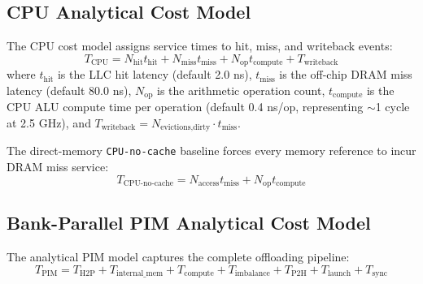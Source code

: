 \documentclass[journal,10pt,twocolumn]{IEEEtran}
\begin{document}
\subsection{CPU Analytical Cost Model}
The CPU cost model assigns service times to hit, miss, and writeback events:
\begin{equation}
T_{\text{CPU}} = N_{\text{hit}} t_{\text{hit}} + N_{\text{miss}} t_{\text{miss}} + N_{\text{op}} t_{\text{compute}} + T_{\text{writeback}}
\end{equation}
where $t_{\text{hit}}$ is the LLC hit latency (default 2.0 ns), $t_{\text{miss}}$ is the off-chip DRAM miss latency (default 80.0 ns), $N_{\text{op}}$ is the arithmetic operation count, $t_{\text{compute}}$ is the CPU ALU compute time per operation (default 0.4 ns/op, representing $\sim$1 cycle at 2.5 GHz), and $T_{\text{writeback}} = N_{\text{evictions,dirty}} \cdot t_{\text{miss}}$.

The direct-memory \texttt{CPU-no-cache} baseline forces every memory reference to incur DRAM miss service:
\begin{equation}
T_{\text{CPU-no-cache}} = N_{\text{access}} t_{\text{miss}} + N_{\text{op}} t_{\text{compute}}
\end{equation}

\subsection{Bank-Parallel PIM Analytical Cost Model}
The analytical PIM model captures the complete offloading pipeline:
\begin{equation}
T_{\text{PIM}} = T_{\text{H2P}} + T_{\text{internal\_mem}} + T_{\text{compute}} + T_{\text{imbalance}} + T_{\text{P2H}} + T_{\text{launch}} + T_{\text{sync}}
\end{equation}
\end{document}
